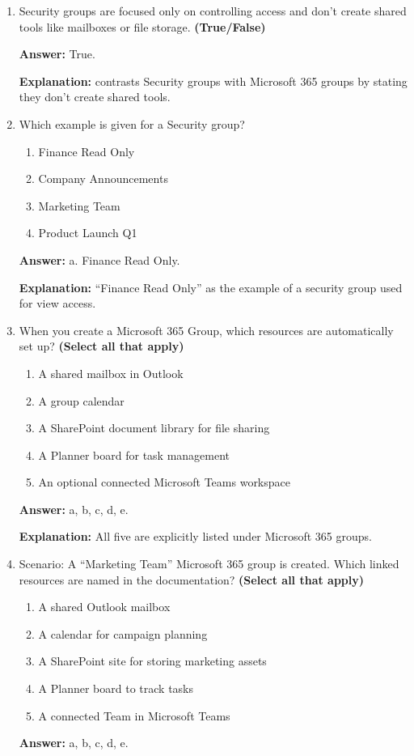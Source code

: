 \documentclass[10pt]{article}
\begin{document}
\begin{enumerate}[leftmargin=*]
\textbf{Explanation:} All five are described in separate paragraphs.

\item Security groups are focused only on controlling access and don’t create shared tools like mailboxes or file storage. \textbf{(True/False)}

\textbf{Answer:} True.

\textbf{Explanation:} contrasts Security groups with Microsoft 365 groups by stating they don’t create shared tools.

\item Which example is given for a Security group?
\begin{enumerate}[label=\alph*., leftmargin=1.5em]
\item Finance Read Only
\item Company Announcements
\item Marketing Team
\item Product Launch Q1
\end{enumerate}
\textbf{Answer:} a. Finance Read Only.

\textbf{Explanation:} ``Finance Read Only'' as the example of a security group used for view access.

\item When you create a Microsoft 365 Group, which resources are automatically set up? \textbf{(Select all that apply)}
\begin{enumerate}[label=\alph*., leftmargin=1.5em]
\item A shared mailbox in Outlook
\item A group calendar
\item A SharePoint document library for file sharing
\item A Planner board for task management
\item An optional connected Microsoft Teams workspace
\end{enumerate}
\textbf{Answer:} a, b, c, d, e.

\textbf{Explanation:} All five are explicitly listed under Microsoft 365 groups.

\item Scenario: A ``Marketing Team'' Microsoft 365 group is created. Which linked resources are named in the documentation? \textbf{(Select all that apply)}
\begin{enumerate}[label=\alph*., leftmargin=1.5em]
\item A shared Outlook mailbox
\item A calendar for campaign planning
\item A SharePoint site for storing marketing assets
\item A Planner board to track tasks
\item A connected Team in Microsoft Teams
\end{enumerate}
\textbf{Answer:} a, b, c, d, e.


\end{enumerate}
\end{document}
